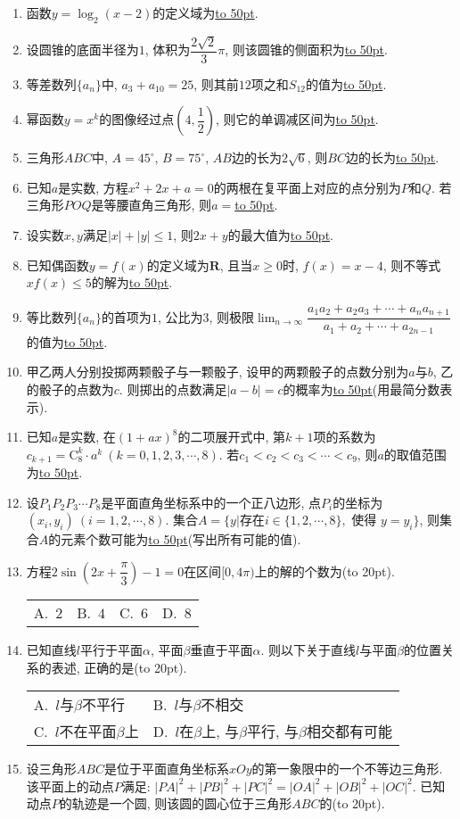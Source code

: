 \documentclass[10pt,a4paper]{article}
\newcommand{\blank}[1]{\underline{\hbox to #1pt{}}}
\newcommand{\bracket}[1]{(\hbox to #1pt{})}
\newcommand{\twoch}[4]{\par\begin{tabular}{p{.46\textwidth}p{.46\textwidth}}
A.~#1& B.~#2\\
C.~#3& D.~#4
\end{tabular}}
\newcommand{\fourch}[4]{\par\begin{tabular}{p{.23\textwidth}p{.23\textwidth}p{.23\textwidth}p{.23\textwidth}}
A.~#1 &B.~#2& C.~#3& D.~#4
\end{tabular}}
\begin{document}
\begin{enumerate}[1.]


\item 函数$y=\log_2(x-2)$的定义域为\blank{50}.
\item 设圆锥的底面半径为$1$, 体积为$\dfrac{2\sqrt 2}3\pi$, 则该圆锥的侧面积为\blank{50}.
\item 等差数列$\{a_n\}$中, $a_3+a_{10}=25$, 则其前$12$项之和$S_{12}$的值为\blank{50}.
\item 幂函数$y=x^k$的图像经过点$(4,\dfrac 12)$, 则它的单调减区间为\blank{50}.
\item 三角形$ABC$中, $A=45^\circ$, $B=75^\circ$, $AB$边的长为$2\sqrt 6$, 则$BC$边的长为\blank{50}.
\item 已知$a$是实数, 方程$x^2+2x+a=0$的两根在复平面上对应的点分别为$P$和$Q$. 若三角形$POQ$是等腰直角三角形, 则$a=$\blank{50}.
\item 设实数$x,y$满足$|x|+|y|\le 1$, 则$2x+y$的最大值为\blank{50}.
\item 已知偶函数$y=f(x)$的定义域为$\mathbf{R}$, 且当$x\ge 0$时, $f(x)=x-4$, 则不等式$xf(x)\le 5$的解为\blank{50}.
\item 等比数列$\{a_n\}$的首项为$1$, 公比为$3$, 则极限$\lim_{n\to \infty}\dfrac{a_1a_2+a_2a_3+\cdots+a_na_{n+1}}{a_1+a_2+\cdots+a_{2n-1}}$的值为\blank{50}.
\item 甲乙两人分别投掷两颗骰子与一颗骰子, 设甲的两颗骰子的点数分别为$a$与$b$, 乙的骰子的点数为$c$. 则掷出的点数满足$|a-b|=c$的概率为\blank{50}(用最简分数表示).
\item 已知$a$是实数, 在$(1+ax)^8$的二项展开式中, 第$k+1$项的系数为$c_{k+1}=\mathrm{C}_8^k\cdot a^k \ (k=0,1,2,3,\cdots,8)$. 若$c_1<c_2<c_3<\cdots<c_9$, 则$a$的取值范围为\blank{50}.
\item 设$P_1P_2P_3\cdots P_8$是平面直角坐标系中的一个正八边形, 点$P_i$的坐标为$(x_i,y_i) \ (i=1,2,\cdots,8)$. 集合$A=\{y|\text{存在} i\in \{1,2,\cdots,8\},\text{ 使得 }y=y_i\}$, 则集合$A$的元素个数可能为\blank{50}(写出所有可能的值).
\item 方程$2\sin (2x+\dfrac{\pi}3)-1=0$在区间$[0,4\pi)$上的解的个数为\bracket{20}.
\fourch{$2$}{$4$}{$6$}{$8$}
\item 已知直线$l$平行于平面$\alpha$, 平面$\beta$垂直于平面$\alpha$. 则以下关于直线$l$与平面$\beta$的位置关系的表述, 正确的是\bracket{20}.
\twoch{$l$与$\beta$不平行}{$l$与$\beta$不相交
}{$l$不在平面$\beta$上}{$l$在$\beta$上, 与$\beta$平行, 与$\beta$相交都有可能}
\item 设三角形$ABC$是位于平面直角坐标系$xOy$的第一象限中的一个不等边三角形. 该平面上的动点$P$满足: $|PA|^2+|PB|^2+|PC|^2=|OA|^2+|OB|^2+|OC|^2$. 已知动点$P$的轨迹是一个圆, 则该圆的圆心位于三角形$ABC$的\bracket{20}.

\end{enumerate}
\end{document}

